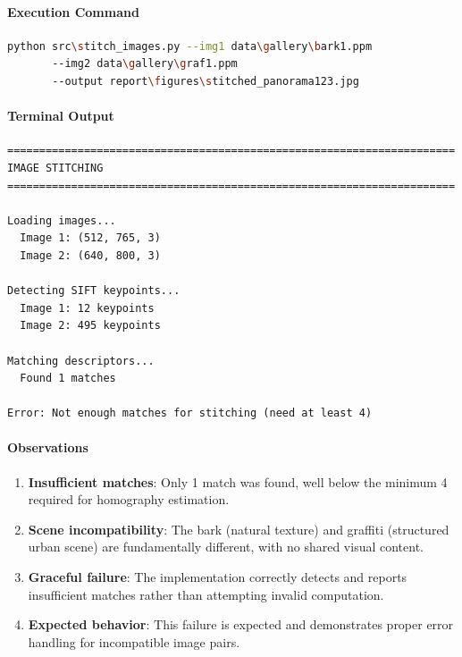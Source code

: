 \documentclass[12pt,a4paper]{article}
\begin{document}
\paragraph{Execution Command}
\begin{lstlisting}[language=bash]
python src\stitch_images.py --img1 data\gallery\bark1.ppm 
       --img2 data\gallery\graf1.ppm 
       --output report\figures\stitched_panorama123.jpg
\end{lstlisting}

\paragraph{Terminal Output}
\begin{lstlisting}
======================================================================
IMAGE STITCHING
======================================================================

Loading images...
  Image 1: (512, 765, 3)
  Image 2: (640, 800, 3)

Detecting SIFT keypoints...
  Image 1: 12 keypoints
  Image 2: 495 keypoints

Matching descriptors...
  Found 1 matches

Error: Not enough matches for stitching (need at least 4)
\end{lstlisting}

\paragraph{Observations}
\begin{enumerate}
    \item \textbf{Insufficient matches}: Only 1 match was found, well below the minimum 4 required for homography estimation.
    
    \item \textbf{Scene incompatibility}: The bark (natural texture) and graffiti (structured urban scene) are fundamentally different, with no shared visual content.
    
    \item \textbf{Graceful failure}: The implementation correctly detects and reports insufficient matches rather than attempting invalid computation.
    
    \item \textbf{Expected behavior}: This failure is expected and demonstrates proper error handling for incompatible image pairs.
\end{enumerate}
\end{document}
